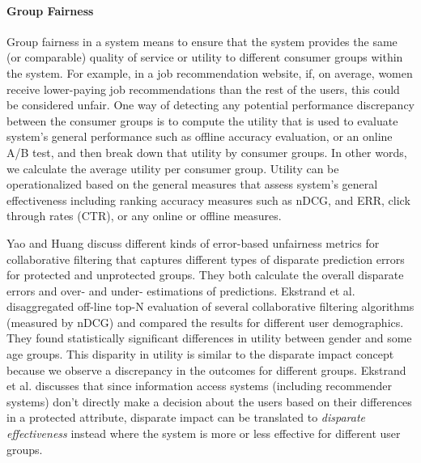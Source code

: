             \vspace{0.25cm}
            \noindent \paragraph{Group Fairness}
            \vspace{0.25cm}
                Group fairness in a system means to ensure that the system provides the same (or comparable) quality of service or utility to different consumer groups within the system. For example, in a job recommendation website, if, on average, women receive lower-paying job recommendations than the rest of the users, this could be considered unfair. One way of detecting any potential performance discrepancy between the consumer groups is to compute the utility that is used to evaluate system's general performance such as offline accuracy evaluation, or an online A/B test, and then break down that utility by consumer groups. In other words, we calculate the average utility per consumer group. Utility can be operationalized based on the general measures that assess system's general effectiveness including ranking accuracy measures such as nDCG, and ERR, click through rates (CTR), or any online or offline measures.
            
                Yao and Huang \cite{yao_huang_fatml-2017} discuss different kinds of error-based unfairness metrics for collaborative filtering that captures different types of disparate prediction errors for protected and unprotected groups. They both calculate the overall disparate errors and over- and under- estimations of predictions. Ekstrand et al. \cite{ekstrand2018all} disaggregated off-line top-N evaluation of several collaborative filtering algorithms (measured by nDCG) and compared the results for different user demographics. They found statistically significant differences in utility between gender and some age groups. This disparity in utility is similar to the disparate impact concept because we observe a discrepancy in the outcomes for different groups. Ekstrand et al. \cite{ekstrand2021fairness} discusses that since information access systems (including recommender systems) don't directly make a decision about the users based on their differences in a protected attribute, disparate impact can be translated to \textit{disparate effectiveness} instead where the system is more or less effective for different user groups. 
            
